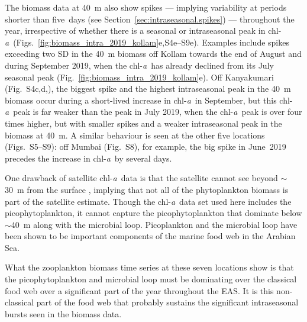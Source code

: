 \documentclass[authoryear,review,11pt]{elsarticle}
\newcommand{\chla}{chl-{\emph{a}}}
\begin{document}
The biomass data at 40~m also show spikes --- implying variability at periods shorter than five~days (see Section~\ref{sec:intraseasonal.spikes}) --- throughout the year, irrespective of whether there is a seasonal or intraseasonal peak in \chla\ (Figs.~\ref{fig:biomass_intra_2019_kollam}e,S4e--S9e).  Examples include spikes exceeding two SD in the 40~m biomass off Kollam towards the end of August and during September 2019, when the \chla\ has already declined from its July seasonal peak (Fig.~\ref{fig:biomass_intra_2019_kollam}e).  Off Kanyakumari (Fig.~S4c,d,), the biggest spike and the highest intraseasonal peak in the 40~m biomass occur during a short-lived increase in \chla\ in September, but this \chla\ peak is far weaker than the peak in July 2019, when the \chla\ peak is over four times higher, but with smaller spikes and a weaker intraseasonal peak in the biomass at 40~m.  A similar behaviour is seen at the other five locations (Figs.~S5--S9): off Mumbai (Fig.~S8), for example, the big spike in June~2019 precedes the increase in \chla\ by several days.

One drawback of satellite \chla\ data is that the satellite cannot see beyond $\sim$30~m from the surface \citep[maximum is $\sim$40~m in clear water;][]{andre1992ocean}, implying that not all of the phytoplankton biomass is part of the satellite estimate. Though the \chla\ data set used here includes the picophytoplankton, it cannot capture the picophytoplankton that dominate below $\sim$40~m along with the microbial loop. Picoplankton \citep{campbell1986estimating, campbell1998response, bemal2018picophytoplankton} and the microbial loop \citep{azam1983microbial, madhupratap1996lack, madhupratap1996mechanism, anil2021short} have been shown to be important components of the marine food web in the Arabian Sea.


What the zooplankton biomass time series at these seven locations show is that the picophytoplankton and microbial loop must be dominating over the classical food web \citep{bemal2018picophytoplankton, anil2021short} over a significant part of the year throughout the EAS. It is this non-classical part of the food web that probably sustains the significant intraseasonal bursts seen in the biomass data.  
\end{document}
